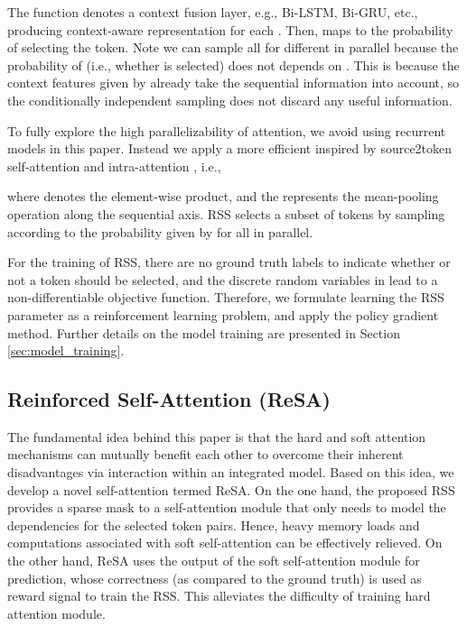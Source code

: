 \documentclass{article}
\begin{document}
The function  denotes a context fusion layer, e.g., Bi-LSTM, Bi-GRU, etc., producing context-aware representation for each . Then,  maps  to the probability of selecting the token. Note we can sample all  for different  in parallel because the probability of  (i.e., whether  is selected) does not depends on . This is because the context features given by  already take the sequential information into account, so the conditionally independent sampling does not discard any useful information. 

To fully explore the high parallelizability of attention, we avoid using recurrent models in this paper. Instead we apply a more efficient  inspired by source2token self-attention and intra-attention \cite{liu2016learning}, i.e., 

where  denotes the element-wise product, and the  represents the mean-pooling operation along the sequential axis. RSS selects a subset of tokens by sampling  according to the probability given by  for all  in parallel.

For the training of RSS, there are no ground truth labels to indicate whether or not a token should be selected, and the discrete random variables in  lead to a non-differentiable objective function. Therefore, we formulate learning the RSS parameter  as a reinforcement learning problem, and apply the policy gradient method. Further details on the model training are presented in Section \ref{sec:model_training}. 

\subsection{Reinforced Self-Attention (ReSA)} \label{sec:resa}

The fundamental idea behind this paper is that the hard and soft attention mechanisms can mutually benefit each other to overcome their inherent disadvantages via interaction within an integrated model. Based on this idea, we develop a novel self-attention termed ReSA. On the one hand, the proposed RSS provides a sparse mask to a self-attention module that only needs to model the dependencies for the selected token pairs. Hence, heavy memory loads and computations associated with soft self-attention can be effectively relieved. On the other hand, ReSA uses the output of the soft self-attention module for prediction, whose correctness (as compared to the ground truth) is used as reward signal to train the RSS. This alleviates the difficulty of training hard attention module. 
\end{document}
